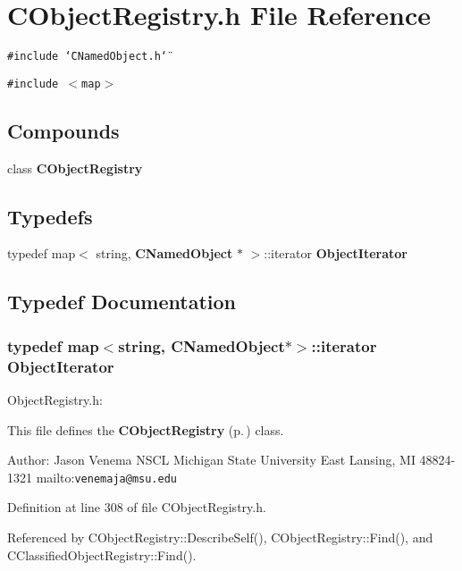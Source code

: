 \section{CObject\-Registry.h File Reference}
\label{CObjectRegistry_8h}
{\tt \#include \char`\"{}CNamed\-Object.h\char`\"{}}\par
{\tt \#include $<$map$>$}\par
\subsection*{Compounds}
\begin{CompactItemize}
\item 
class {\bf CObject\-Registry}
\end{CompactItemize}
\subsection*{Typedefs}
\begin{CompactItemize}
\item 
typedef map$<$ string, {\bf CNamed\-Object} $\ast$ $>$::iterator {\bf Object\-Iterator}
\end{CompactItemize}


\subsection{Typedef Documentation}
\subsubsection{\setlength{\rightskip}{0pt plus 5cm}typedef map$<$string, {\bf CNamed\-Object}$\ast$$>$::iterator Object\-Iterator}\label{CObjectRegistry_8h_a0}


Object\-Registry.h:

This file defines the {\bf CObject\-Registry} {\rm (p.\,\pageref{classCObjectRegistry})} class.

Author: Jason Venema NSCL Michigan State University East Lansing, MI 48824-1321 mailto:{\tt venemaja@msu.edu} 

Definition at line 308 of file CObject\-Registry.h.

Referenced by CObject\-Registry::Describe\-Self(), CObject\-Registry::Find(), and CClassified\-Object\-Registry::Find().